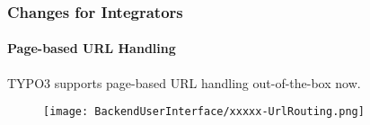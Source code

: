 \begin{frame}[fragile]
	\frametitle{Changes for Integrators}
	\framesubtitle{Page-based URL Handling}

 	TYPO3 supports page-based URL handling out-of-the-box now.

	\begin{figure}
		\texttt{[image: BackendUserInterface/xxxxx-UrlRouting.png]}
	\end{figure}

\end{frame}



%
%

